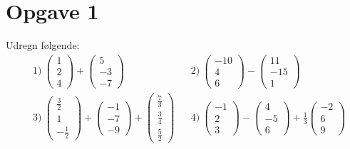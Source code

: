 
\section*{Opgave 1}

Udregn følgende:
\begin{align*}
	&1) \ 
	\begin{pmatrix}
		1 \\ 2 \\ 4
	\end{pmatrix} + 
	\begin{pmatrix}
		5 \\ -3 \\ -7	
	\end{pmatrix}	 
	&&2) \  
	\begin{pmatrix}
		-10 \\ 4 \\ 6
	\end{pmatrix} - 
	\begin{pmatrix}
		11 \\ -15 \\ 1	
	\end{pmatrix}	 \\
	&3) \ 
	\begin{pmatrix}
		\frac{3}{2} \\ 1 \\ -\frac{1}{2}
	\end{pmatrix} + 
	\begin{pmatrix}
		-1 \\ -7 \\ -9	
	\end{pmatrix} +
	\begin{pmatrix}
		\frac{7}{3} \\ \frac{3}{4} \\ \frac{5}{2}	
	\end{pmatrix}	 
	&&4) \  
	\begin{pmatrix}
		-1 \\ 2 \\ 3
	\end{pmatrix} - 
	\begin{pmatrix}
		4 \\ -5 \\ 6	
	\end{pmatrix}+ \frac{1}{3}
	\begin{pmatrix}
		-2 \\ 6 \\ 9
	\end{pmatrix}
\end{align*}

